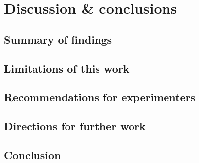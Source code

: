 
\chapter{Discussion \& conclusions}

\section{Summary of findings}




\section{Limitations of this work}

\section{Recommendations for experimenters}

\section{Directions for further work}

\section{Conclusion}
